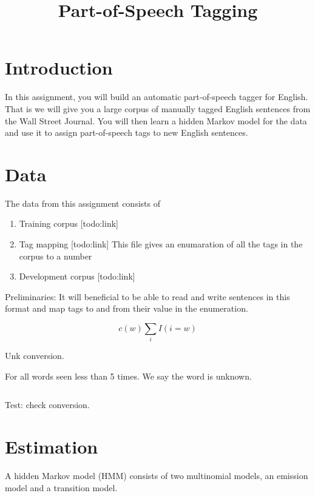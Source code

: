 \documentclass{article}
\title{Part-of-Speech Tagging}
\begin{document}
\maketitle{}

\section{Introduction}

In this assignment, you will build an automatic part-of-speech tagger for English. That is we will give you a large corpus of manually tagged English sentences from the Wall Street Journal. You will then learn a hidden Markov model for the data and use it to assign part-of-speech tags to new English sentences. 

\section{Data}

The data from this assignment consists of 

\begin{enumerate}
  \item Training corpus [todo:link] 
  \item Tag mapping [todo:link] This file gives an enumaration of all the tags in the corpus to a number 
  \item Development corpus [todo:link] 
\end{enumerate}

Preliminaries: It will beneficial to be able to read and write sentences in this format and map tags to and from their value in the enumeration. 


\[ c(w) \sum_i I(i = w ) \] 

Unk conversion. 

For all words seen less than 5 times. We say the word is unknown. 

\begin{verbatim}

\end{verbatim}

Test: check conversion.



\section{Estimation}

A hidden Markov model (HMM) consists of two multinomial models, an emission model and a transition model. 
\end{document}
